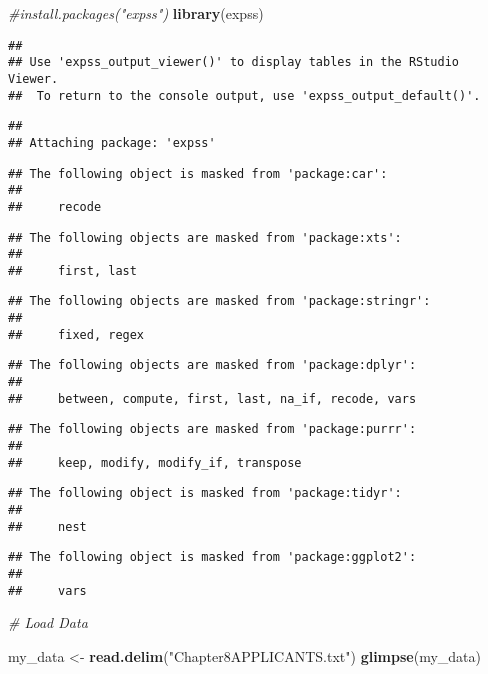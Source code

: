 \documentclass[]{article}
\newenvironment{Shaded}{\begin{snugshade}}{\end{snugshade}}
\newcommand{\KeywordTok}[1]{\textcolor[rgb]{0.13,0.29,0.53}{\textbf{#1}}}
\newcommand{\StringTok}[1]{\textcolor[rgb]{0.31,0.60,0.02}{#1}}
\newcommand{\CommentTok}[1]{\textcolor[rgb]{0.56,0.35,0.01}{\textit{#1}}}
\newcommand{\NormalTok}[1]{#1}
\begin{document}
\begin{Shaded}
\begin{Highlighting}[]
\CommentTok{#install.packages("expss")}
\KeywordTok{library}\NormalTok{(expss)}
\end{Highlighting}
\end{Shaded}

\begin{verbatim}
## 
## Use 'expss_output_viewer()' to display tables in the RStudio Viewer.
##  To return to the console output, use 'expss_output_default()'.
\end{verbatim}

\begin{verbatim}
## 
## Attaching package: 'expss'
\end{verbatim}

\begin{verbatim}
## The following object is masked from 'package:car':
## 
##     recode
\end{verbatim}

\begin{verbatim}
## The following objects are masked from 'package:xts':
## 
##     first, last
\end{verbatim}

\begin{verbatim}
## The following objects are masked from 'package:stringr':
## 
##     fixed, regex
\end{verbatim}

\begin{verbatim}
## The following objects are masked from 'package:dplyr':
## 
##     between, compute, first, last, na_if, recode, vars
\end{verbatim}

\begin{verbatim}
## The following objects are masked from 'package:purrr':
## 
##     keep, modify, modify_if, transpose
\end{verbatim}

\begin{verbatim}
## The following object is masked from 'package:tidyr':
## 
##     nest
\end{verbatim}

\begin{verbatim}
## The following object is masked from 'package:ggplot2':
## 
##     vars
\end{verbatim}

\begin{Shaded}
\begin{Highlighting}[]
\CommentTok{# Load Data}

\NormalTok{my_data <-}\StringTok{ }\KeywordTok{read.delim}\NormalTok{(}\StringTok{"Chapter8APPLICANTS.txt"}\NormalTok{)}
\KeywordTok{glimpse}\NormalTok{(my_data)}
\end{Highlighting}
\end{Shaded}
\end{document}
